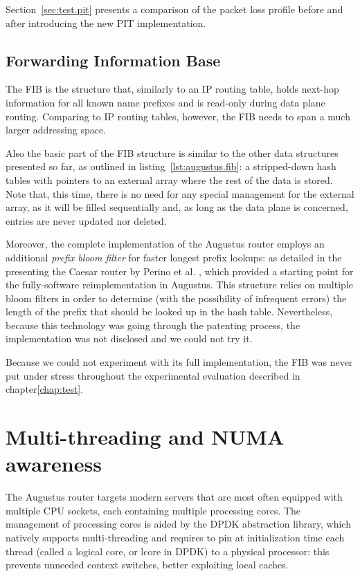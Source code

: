 \documentclass[11pt,a4paper,twoside,titlepage,openany]{book}
\newcommand{\mono}[1]{{\footnotesize \ttfamily #1}}
\begin{document}
Section~\ref{sec:test.pit} presents a comparison of the packet loss profile before and after introducing the new PIT implementation.

\subsection{Forwarding Information Base}\label{sec:augustus.fib}
The \gls{FIB} is the structure that, similarly to an IP routing table, holds next-hop information for all known name prefixes and is read-only during data plane routing. Comparing to IP routing tables, however, the \gls{FIB} needs to span a much larger addressing space.

Also the basic part of the FIB structure is similar to the other data structures presented so far, as outlined in listing~\ref{lst:augustus.fib}: a stripped-down hash tables with pointers to an external array where the rest of the data is stored. Note that, this time, there is no need for any special management for the external array, as it will be filled sequentially and, as long as the data plane is concerned, entries are never updated nor deleted.

Moreover, the complete implementation of the Augustus router employs an additional \emph{prefix bloom filter} for faster longest prefix lookups: as detailed in the presenting the Caesar router by Perino et al. \cite{caesar}, which provided a starting point for the fully-software reimplementation in Augustus. This structure relies on multiple bloom filters in order to determine (with the possibility of infrequent errors) the length of the prefix that should be looked up in the hash table.
Nevertheless, because this technology was going through the patenting process, the implementation was not disclosed and we could not try it.

Because we could not experiment with its full implementation, the \gls{FIB} was never put under stress throughout the experimental evaluation described in chapter\ref{chap:test}.

\section{Multi-threading and NUMA awareness}\label{sec:augustus.numa}
The Augustus router targets modern servers that are most often equipped with multiple CPU sockets, each containing multiple processing cores. The management of processing cores is aided by the DPDK abstraction library, which natively supports multi-threading and requires to pin at initialization time each thread (called a logical core, or \mono{lcore} in DPDK) to a physical processor: this prevents unneeded context switches, better exploiting local caches.
\end{document}
